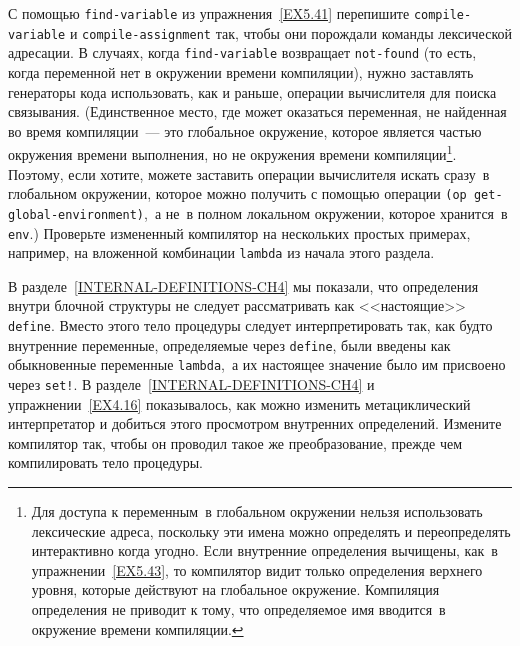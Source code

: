 \begin{exercise}{5.42}%
\label{EX5.42}%
С помощью {\tt find-variable} из 
упражнения~\ref{EX5.41} перепишите {\tt compile-variable} и
{\tt compile-assignment} так, чтобы они порождали команды
лексической адресации.  В случаях, когда {\tt find-variable}
возвращает {\tt not-found} (то есть, когда переменной нет в
окружении времени компиляции), нужно заставлять генераторы кода
использовать, как и раньше, операции вычислителя для поиска
связывания.  (Единственное место, где может оказаться переменная, не
найденная во время компиляции~--- это глобальное окружение, которое
является частью окружения времени выполнения, но не окружения времени
компиляции\footnote{Для доступа к переменным~в глобальном окружении
нельзя использовать лексические адреса, поскольку эти имена можно
определять и переопределять интерактивно когда угодно.  Если
внутренние определения вычищены, как~в 
упражнении~\ref{EX5.43}, то компилятор видит только определения
верхнего уровня, которые действуют на глобальное окружение.
Компиляция определения не приводит к тому, что определяемое имя
вводится~в окружение времени компиляции.
}. 
Поэтому, если хотите, можете заставить операции вычислителя искать
сразу~в глобальном окружении, которое можно получить с помощью
операции {\tt (op get-global-environment)},~а не~в полном
локальном окружении, которое хранится~в {\tt env}.)  Проверьте
измененный компилятор на нескольких простых примерах, например, на
вложенной комбинации {\tt lambda} из начала этого раздела.
\end{exercise}
\begin{exercise}{5.43}%
\label{EX5.43}%
% 
%
В разделе~\ref{INTERNAL-DEFINITIONS-CH4} мы
показали, что определения внутри блочной структуры не следует
рассматривать как <<настоящие>> {\tt define}.  Вместо этого
тело процедуры следует интерпретировать так, как будто внутренние
переменные, определяемые через {\tt define}, были введены как
обыкновенные переменные {\tt lambda},~а их настоящее значение
было им присвоено через {\tt set!}.  В 
разделе~\ref{INTERNAL-DEFINITIONS-CH4} и 
упражнении~\ref{EX4.16}
показывалось, как можно изменить метациклический интерпретатор и
добиться этого просмотром внутренних определений.  Измените
компилятор так, чтобы он проводил такое же преобразование, прежде чем
компилировать тело процедуры.
\end{exercise}
